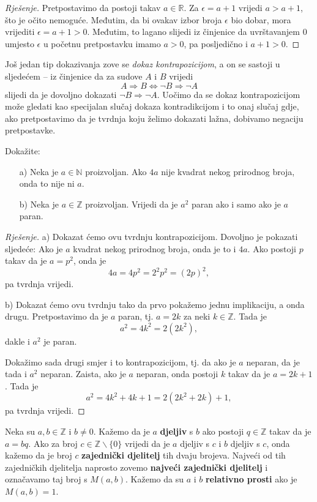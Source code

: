 \begin{proof}[Rješenje]
Pretpostavimo da postoji takav $a\in \mathbb{R}$. Za $\epsilon=a+1$ vrijedi $a>a+1$, što je očito nemoguće. Međutim, da bi ovakav izbor broja $\epsilon$ bio dobar, mora vrijediti $\epsilon=a+1>0$. Međutim, to lagano slijedi iz činjenice da uvrštavanjem $0$ umjesto $\epsilon$ u početnu pretpostavku imamo $a>0$, pa posljedično i $a+1>0$.
\end{proof}
Još jedan tip dokazivanja zove se \textit{dokaz kontrapozicijom}, a on se sastoji u sljedećem -- iz činjenice da za sudove $A$ i $B$ vrijedi 
$$A\Rightarrow B\Leftrightarrow \neg B\Rightarrow \neg A$$
slijedi da je dovoljno dokazati $\neg B\Rightarrow \neg A$. Uočimo da se dokaz kontrapozicijom može gledati kao specijalan slučaj dokaza kontradikcijom i to onaj slučaj gdje, ako pretpostavimo da je tvrdnja koju želimo dokazati lažna, dobivamo negaciju pretpostavke.

\begin{exercise}
Dokažite: \begin{itemize}
\item[a)] Neka je $a\in \mathbb{N}$ proizvoljan. Ako $4a$ nije kvadrat nekog prirodnog broja, onda to nije ni $a$.
\item[b)] Neka je $a\in \mathbb{Z}$ proizvoljan. Vrijedi da je $a^2$ paran ako i samo ako je $a$ paran.
\end{itemize}
\end{exercise}
\begin{proof}[Rješenje]
a) Dokazat ćemo ovu tvrdnju kontrapozicijom. Dovoljno je pokazati sljedeće: Ako je $a$ kvadrat nekog prirodnog broja, onda je to i $4a$. Ako postoji $p$ takav da je $a=p^2$, onda je $$4a=4p^2=2^2p^2=(2p)^2,$$ 
pa tvrdnja vrijedi.

b) Dokazat ćemo ovu tvrdnju tako da prvo pokažemo jednu implikaciju, a onda drugu. Pretpostavimo da je $a$ paran, tj. $a=2k$ za neki $k\in \mathbb{Z}$. Tada je $$a^2=4k^2=2(2k^2),$$ dakle i $a^2$ je paran. 

Dokažimo sada drugi smjer i to kontrapozicijom, tj. da ako je $a$ neparan, da je tada i $a^2$ neparan. Zaista, ako je $a$ neparan, onda postoji $k$ takav da je $a=2k+1$. Tada je $$a^2=4k^2+4k+1=2(2k^2+2k)+1,$$ 
pa tvrdnja vrijedi.
\end{proof}
\begin{definition}
Neka su $a, b\in \mathbb{Z}$ i $b\neq 0$. Kažemo da je $a$ \textbf{djeljiv} s $b$ ako postoji $q\in \mathbb{Z}$ takav da je $a=bq$. Ako za broj $c\in \mathbb{Z}\backslash \{0\}$ vrijedi da je $a$ djeljiv s $c$ i $b$ djeljiv s $c$, onda kažemo da je broj $c$ \textbf{zajednički djelitelj} tih dvaju brojeva. Najveći od tih zajedničkih djelitelja naprosto zovemo \textbf{najveći zajednički djelitelj} i označavamo taj broj s $M(a, b)$. Kažemo da su $a$ i $b$ \textbf{relativno prosti} ako je $M(a, b)=1$.
\end{definition}

